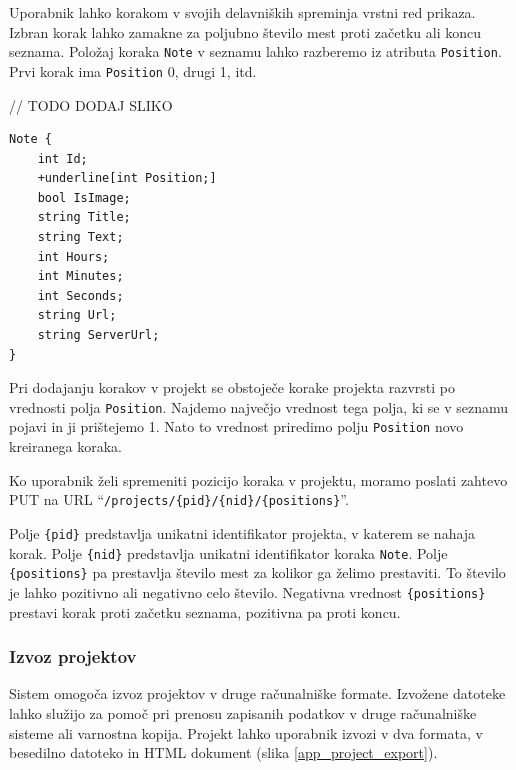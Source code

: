 \documentclass[a4paper, 12pt]{book}
\begin{document}
Uporabnik lahko korakom v svojih delavniških spreminja vrstni red prikaza.
Izbran korak lahko zamakne za poljubno število mest proti začetku ali koncu seznama.
Položaj koraka \texttt{Note} v seznamu lahko razberemo iz atributa \texttt{Position}.
Prvi korak ima \texttt{Position} 0, drugi 1, itd.

// TODO DODAJ SLIKO 

\begin{Verbatim}[commandchars=+\[\]]
Note { 
    int Id; 
    +underline[int Position;]
    bool IsImage;  
    string Title; 
    string Text;
    int Hours; 
    int Minutes;
    int Seconds;
    string Url;
    string ServerUrl;
}
\end{Verbatim}

Pri dodajanju korakov v projekt se obstoječe korake projekta razvrsti po vrednosti polja \texttt{Position}.
Najdemo največjo vrednost tega polja, ki se v seznamu pojavi in ji prištejemo 1.
Nato to vrednost priredimo polju \texttt{Position} novo kreiranega koraka.

Ko uporabnik želi spremeniti pozicijo koraka v projektu, moramo poslati zahtevo PUT na URL \enquote{\texttt{/projects/\{pid\}/\{nid\}/\{positions\}}}.

Polje \texttt{\{pid\}} predstavlja unikatni identifikator projekta, v katerem se nahaja korak.
Polje \texttt{\{nid\}} predstavlja unikatni identifikator koraka \texttt{Note}.
Polje \texttt{\{positions\}} pa prestavlja število mest za kolikor ga želimo prestaviti.
To število je lahko pozitivno ali negativno celo število.
Negativna vrednost \texttt{\{positions\}} prestavi korak proti začetku seznama, pozitivna pa proti koncu.

\subsubsection{Izvoz projektov}

Sistem omogoča izvoz projektov v druge računalniške formate.
Izvožene datoteke lahko služijo za pomoč pri prenosu zapisanih podatkov v druge računalniške sisteme ali varnostna kopija.
Projekt lahko uporabnik izvozi v dva formata, v besedilno datoteko in HTML dokument (slika \ref{app_project_export}).
\end{document}
